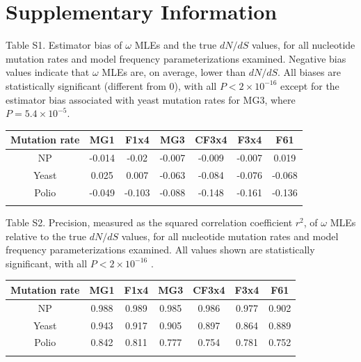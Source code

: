 \documentclass[11pt]{article}
\begin{document}
\clearpage

	
\section*{Supplementary Information}

\vspace{2cm}

\noindent Table S1. Estimator bias of $\omega$ MLEs and the true $dN/dS$ values, for all nucleotide mutation rates and model frequency parameterizations examined. Negative bias values indicate that $\omega$ MLEs are, on average, lower than $dN/dS$. All biases are statistically significant (different from 0), with all $P < 2\times10^{-16}$ except for the estimator bias associated with yeast mutation rates for MG3, where $P = 5.4\times10^{-5}$.
\begin{table}[htbp]
	\begin{tabular}{c c c c c c c}
		\hline\noalign{\smallskip}
		Mutation rate & MG1 & F1x4 & MG3 & CF3x4 & F3x4 & F61 \\
		\hline\noalign{\smallskip}
		NP & -0.014 & -0.02 & -0.007 & -0.009 & -0.007 & 0.019 \\ 
		Yeast & 0.025 & 0.007 & -0.063 & -0.084 & -0.076 & -0.068 \\ 
		Polio & -0.049 & -0.103 & -0.088 & -0.148 & -0.161 & -0.136 \\ 
		\noalign{\smallskip}\hline\noalign{\smallskip}
	\end{tabular}
\end{table}	


\vspace{2cm}

\noindent Table S2. Precision, measured as the squared correlation coefficient $r^2$, of $\omega$ MLEs relative to the true $dN/dS$ values, for all nucleotide mutation rates and model frequency parameterizations examined. All values shown are statistically significant, with all $P < 2\times10^{-16}$ .
\begin{table}[htbp]
	\begin{tabular}{c c c c c c c}
		\hline\noalign{\smallskip}
		Mutation rate & MG1 & F1x4 & MG3 & CF3x4 & F3x4 & F61 \\
		\hline\noalign{\smallskip}
		NP & 0.988 & 0.989 & 0.985 & 0.986 & 0.977 & 0.902 \\ 
		Yeast & 0.943 & 0.917 & 0.905 & 0.897 & 0.864 & 0.889 \\ 
		Polio & 0.842 & 0.811 & 0.777 & 0.754 & 0.781 & 0.752 \\ 
		\noalign{\smallskip}\hline\noalign{\smallskip}
	\end{tabular}
\end{table}	
\end{document}
